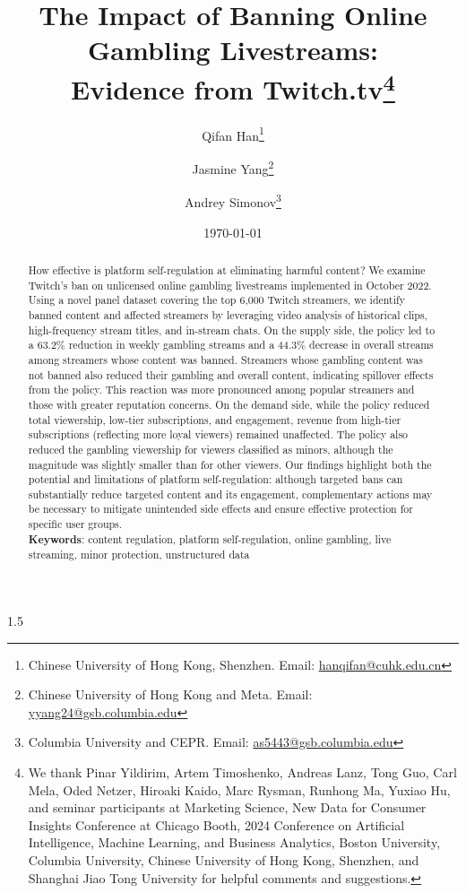 \documentclass[a4paper,12pt]{article}
\title{The Impact of Banning Online Gambling Livestreams: \\Evidence from Twitch.tv\footnote{We thank Pinar Yildirim, Artem Timoshenko, Andreas Lanz, Tong Guo, Carl Mela, Oded Netzer, Hiroaki Kaido, Marc Rysman, Runhong Ma, Yuxiao Hu, and seminar participants at Marketing Science, New Data for Consumer Insights Conference at Chicago Booth, 2024 Conference on Artificial Intelligence, Machine Learning, and Business Analytics, Boston University, Columbia University, Chinese University of Hong Kong, Shenzhen, and Shanghai Jiao Tong University for helpful comments and suggestions.}}
\author{Qifan Han\thanks{Chinese University of Hong Kong, Shenzhen. Email: \href{mailto:hanqifan@cuhk.edu.cn}{hanqifan@cuhk.edu.cn}} \and Jasmine Yang\thanks{Chinese University of Hong Kong and Meta. Email: \href{mailto:yyang24@gsb.columbia.edu}{yyang24@gsb.columbia.edu}} \and Andrey Simonov\thanks{Columbia University and CEPR. Email: \href{mailto:as5443@gsb.columbia.edu}{as5443@gsb.columbia.edu}}}
\date{\today}
\begin{document}
\doparttoc %
\faketableofcontents %

\maketitle
\begin{spacing}{1.5}

\begin{abstract}

\noindent How effective is platform self-regulation at eliminating harmful content? We examine Twitch’s ban on unlicensed online gambling livestreams implemented in October 2022. Using a novel panel dataset covering the top 6,000 Twitch streamers, we identify banned content and affected streamers by leveraging video analysis of historical clips, high-frequency stream titles, and in-stream chats. On the supply side, the policy led to a 63.2\% reduction in weekly gambling streams and a 44.3\% decrease in overall streams among streamers whose content was banned. Streamers whose gambling content was not banned also reduced their gambling and overall content, indicating spillover effects from the policy. This reaction was more pronounced among popular streamers and those with greater reputation concerns. On the demand side, while the policy reduced total viewership, low-tier subscriptions, and engagement, revenue from high-tier subscriptions (reflecting more loyal viewers) remained unaffected. The policy also reduced the gambling viewership for viewers classified as minors, although the magnitude was slightly smaller than for other viewers. Our findings highlight both the potential and limitations of platform self-regulation: although targeted bans can substantially reduce targeted content and its engagement, complementary actions may be necessary to mitigate unintended side effects and ensure effective protection for specific user groups. \\

\noindent \textbf{Keywords}: content regulation, platform self-regulation, online gambling, live streaming, minor protection, unstructured data
\end{abstract}

\thispagestyle{empty}

\newpage 
\setcounter{page}{1}


\end{spacing}
\end{document}
